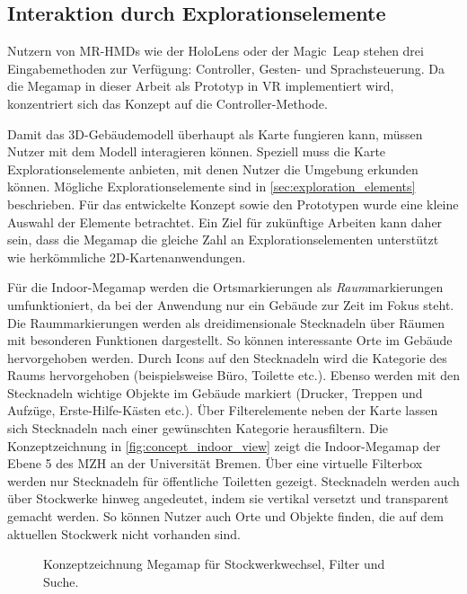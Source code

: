 \subsection{Interaktion durch Explorationselemente}
Nutzern von MR-HMDs wie der HoloLens oder der Magic~Leap stehen drei Eingabemethoden zur Verfügung: Controller, Gesten- und Sprachsteuerung.
Da die Megamap in dieser Arbeit als Prototyp in VR implementiert wird, konzentriert sich das Konzept auf die Controller-Methode.

Damit das 3D-Gebäudemodell überhaupt als Karte fungieren kann, müssen Nutzer mit dem Modell interagieren können.
Speziell muss die Karte Explorationselemente anbieten, mit denen Nutzer die Umgebung erkunden können.
Mögliche Explorationselemente sind in \autoref{sec:exploration_elements} beschrieben.
Für das entwickelte Konzept sowie den Prototypen wurde eine kleine Auswahl der Elemente betrachtet.
Ein Ziel für zukünftige Arbeiten kann daher sein, dass die Megamap die gleiche Zahl an Explorationselementen unterstützt wie herkömmliche 2D-Kartenanwendungen.

Für die Indoor-Megamap werden die Ortsmarkierungen als \emph{Raum}markierungen umfunktioniert, da bei der Anwendung nur ein Gebäude zur Zeit im Fokus steht.
Die Raummarkierungen werden als dreidimensionale Stecknadeln über Räumen mit besonderen Funktionen dargestellt.
So können interessante Orte im Gebäude hervorgehoben werden.
Durch Icons auf den Stecknadeln wird die Kategorie des Raums hervorgehoben (beispielsweise Büro, Toilette etc.).
Ebenso werden mit den Stecknadeln wichtige Objekte im Gebäude markiert (Drucker, Treppen und Aufzüge, Erste-Hilfe-Kästen etc.).
Über Filterelemente neben der Karte lassen sich Stecknadeln nach einer gewünschten Kategorie herausfiltern.
Die Konzeptzeichnung in \autoref{fig:concept_indoor_view} zeigt die Indoor-Megamap der Ebene 5 des MZH an der Universität Bremen.
Über eine virtuelle Filterbox werden nur Stecknadeln für öffentliche Toiletten gezeigt.
Stecknadeln werden auch über Stockwerke hinweg angedeutet, indem sie vertikal versetzt und transparent gemacht werden.
So können Nutzer auch Orte und Objekte finden, die auf dem aktuellen Stockwerk nicht vorhanden sind.
\vfill
\begin{figure}[h]
	\centering
	\caption{Konzeptzeichnung Megamap für Stockwerkwechsel, Filter und Suche.}
	\label{fig:concept_indoor_view}
\end{figure}

